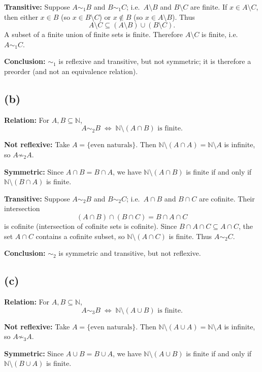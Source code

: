 \documentclass[12pt,a4paper]{article}
\theoremstyle{definition}
\theoremstyle{remark}
\begin{document}
\textbf{Transitive:} Suppose $A \sim_1 B$ and $B \sim_1 C$; i.e.\ $A \setminus B$ and $B \setminus C$ are finite. If $x \in A \setminus C$, then either $x \in B$ (so $x \in B \setminus C$) or $x \notin B$ (so $x \in A \setminus B$). Thus
\[
A \setminus C \subseteq (A \setminus B) \cup (B \setminus C).
\]
A subset of a finite union of finite sets is finite. Therefore $A\setminus C$ is finite, i.e.\ $A \sim_1 C$. 

\textbf{Conclusion:} $\sim_1$ is reflexive and transitive, but not symmetric; it is therefore a preorder (and not an equivalence relation).

\subsection*{(b)}

\textbf{Relation:} For $A,B \subseteq \mathbb{N}$,
\[
A \sim_2 B \;\Longleftrightarrow\; \mathbb{N}\setminus(A\cap B) \text{ is finite}.
\]

\textbf{Not reflexive:} Take $A = \{\text{even naturals}\}$. Then $\mathbb{N}\setminus(A\cap A) = \mathbb{N}\setminus A$ is infinite, so $A \not\sim_2 A$.

\textbf{Symmetric:} Since $A\cap B = B\cap A$, we have $\mathbb{N}\setminus(A\cap B)$ is finite if and only if $\mathbb{N}\setminus(B\cap A)$ is finite.

\textbf{Transitive:} Suppose $A \sim_2 B$ and $B \sim_2 C$; i.e.\ $A\cap B$ and $B\cap C$ are cofinite. Their intersection
\[
(A\cap B)\cap(B\cap C) = B\cap A\cap C
\]
is cofinite (intersection of cofinite sets is cofinite). Since $B\cap A\cap C \subseteq A\cap C$, the set $A\cap C$ contains a cofinite subset, so $\mathbb{N}\setminus(A\cap C)$ is finite. Thus $A \sim_2 C$.

\textbf{Conclusion:} $\sim_2$ is symmetric and transitive, but not reflexive.

\subsection*{(c)}

\textbf{Relation:} For $A,B \subseteq \mathbb{N}$,
\[
A \sim_3 B \;\Longleftrightarrow\; \mathbb{N}\setminus(A\cup B) \text{ is finite}.
\]

\textbf{Not reflexive:} Take $A = \{\text{even naturals}\}$. Then $\mathbb{N}\setminus(A\cup A) = \mathbb{N}\setminus A$ is infinite, so $A \not\sim_3 A$.

\textbf{Symmetric:} Since $A\cup B = B\cup A$, we have $\mathbb{N}\setminus(A\cup B)$ is finite if and only if $\mathbb{N}\setminus(B\cup A)$ is finite.
\end{document}
